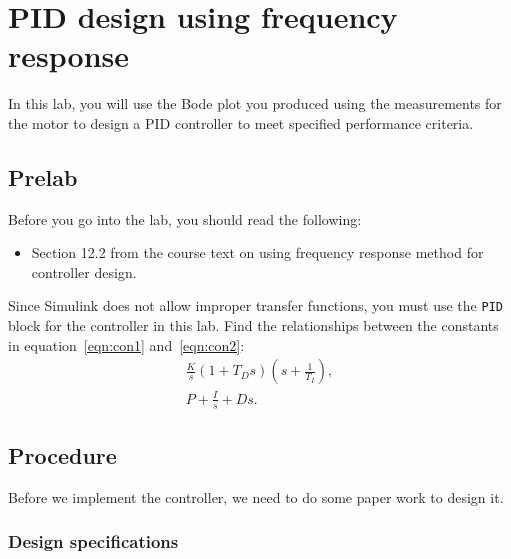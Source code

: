 \chapter{PID design using frequency response}

In this lab, you will use the Bode plot you produced using the measurements
for the motor to design a PID controller to meet specified performance
criteria.

\section{Prelab}

Before you go into the lab, you should read the following:
\begin{itemize}
    \item Section 12.2 from the course text on using
          frequency response method for controller design.
\end{itemize}
Since \textsf{Simulink} does not allow improper transfer functions, you must
use the \verb|PID| block for the controller in this lab.  Find the
relationships between the constants in equation~\eqref{eqn:con1}
and~\eqref{eqn:con2}\@:
\begin{gather}\label{eqn:con1}
    \frac{K}{s}(1+T_{D}s)(s+\frac{1}{T_{I}}),\\\label{eqn:con2}
    P+\frac{I}{s}+Ds.
\end{gather}

\section{Procedure}

Before we implement the controller, we need to do some paper work to design
it.

\subsection{Design specifications}

